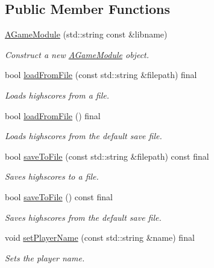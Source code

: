 \subsection*{Public Member Functions}
\begin{DoxyCompactItemize}
\item 
\mbox{\hyperlink{classArcade_1_1Games_1_1AGameModule_a489ae3b9ad35cf20ee05be8e3f365a99}{A\+Game\+Module}} (std\+::string const \&libname)
\begin{DoxyCompactList}\small\item\em Construct a new \mbox{\hyperlink{classArcade_1_1Games_1_1AGameModule}{A\+Game\+Module}} object. \end{DoxyCompactList}\item 
bool \mbox{\hyperlink{classArcade_1_1Games_1_1AGameModule_a1f7e26d79d4c392458407edfe934ff5f}{load\+From\+File}} (const std\+::string \&filepath) final
\begin{DoxyCompactList}\small\item\em Loads highscores from a file. \end{DoxyCompactList}\item 
bool \mbox{\hyperlink{classArcade_1_1Games_1_1AGameModule_a61be4a5123cb5933b10fa0a4c34d8b06}{load\+From\+File}} () final
\begin{DoxyCompactList}\small\item\em Loads highscores from the default save file. \end{DoxyCompactList}\item 
bool \mbox{\hyperlink{classArcade_1_1Games_1_1AGameModule_a16425d9ca7518acbc60fbece4a974009}{save\+To\+File}} (const std\+::string \&filepath) const final
\begin{DoxyCompactList}\small\item\em Saves highscores to a file. \end{DoxyCompactList}\item 
bool \mbox{\hyperlink{classArcade_1_1Games_1_1AGameModule_a82fdd06480edd7f727504f5073730812}{save\+To\+File}} () const final
\begin{DoxyCompactList}\small\item\em Saves highscores from the default save file. \end{DoxyCompactList}\item 
void \mbox{\hyperlink{classArcade_1_1Games_1_1AGameModule_abdbf4cf008033b5f339d9758d7f2b8a2}{set\+Player\+Name}} (const std\+::string \&name) final
\begin{DoxyCompactList}\small\item\em Sets the player name. \end{DoxyCompactList}\item 

\end{DoxyCompactItemize}
